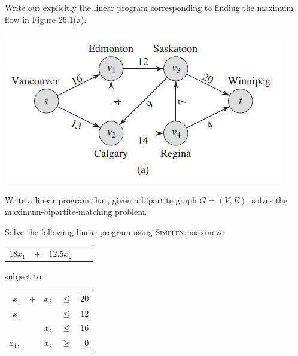 \documentclass[11pt, a4paper, UTF8]{ctexart}
\begin{document}
\begin{problem}[TC 29.2-4]
    Write out explicitly the linear program corresponding to finding the maximum flow
    in Figure 26.1(a).
\end{problem}
\begin{center}
\includegraphics[scale=0.5]{26-1-a.png}
\end{center}
\begin{solution}
    
\end{solution}




\begin{problem}[TC 29.2-6]
Write a linear program that, given a bipartite graph $G =(V,E)$, solves the maximum-bipartite-matching problem.
\end{problem}
\begin{solution}
    
\end{solution}





\begin{problem}[TC 29.3-5]
Solve the following linear program using \textsc{Simplex}:
maximize 
\begin{center}
\begin{tabular}{rrrrr}
$18x_1$ & $+$ & $12.5x_2$
\end{tabular}
\end{center}
subject to
\begin{center}
\begin{tabular}{rrrrr}
$x_1$ & $+$ & $x_2$ & $\leqslant$ & $20$ \\
$x_1$ & $ $ & $ $ & $\leqslant$ & $12$ \\
$ $ & $ $ & $x_2$ & $\leqslant$ & $16$ \\
$x_1,$ & $ $ & $x_2$ & $\geqslant$ & $0$ \\
\end{tabular}
\end{center}
\end{problem}
\begin{solution}
    
\end{solution}
\end{document}
